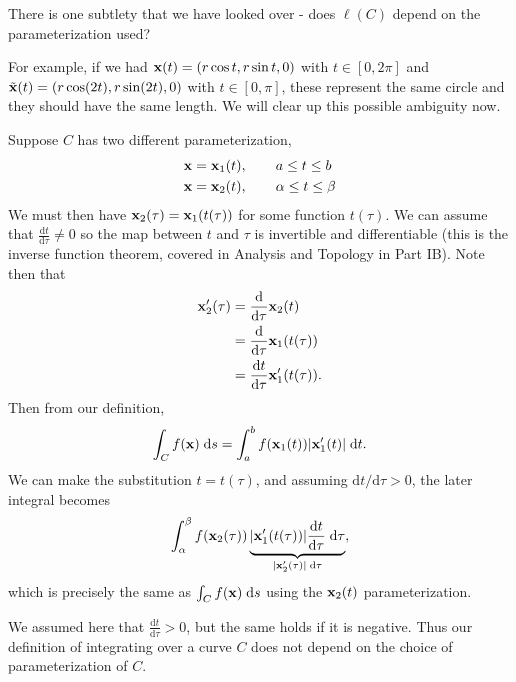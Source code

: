 \documentclass[a4paper]{scrreprt}
\begin{document}
There is one subtlety that we have looked over - does $\ell(C)$ depend on the parameterization used?

For example, if we had $\mathbf{x}(t) = (r \cos t, r \sin t, 0)$ with $t \in [0, 2 \pi]$ and $\tilde{\mathbf{x}}(t) = (r \cos(2 t), r \sin(2 t), 0)$ with $t \in [0, \pi]$, these represent the same circle and they should have the same length. We will clear up this possible ambiguity now.

Suppose $C$ has two different parameterization,
\begin{align*}
	\mathbf{x} &= \mathbf{x}_1(t), \quad \quad a \leq t \leq b \\
	\mathbf{x} &= \mathbf{x}_2(t), \quad \quad \alpha \leq t \leq \beta
\end{align*}
We must then have $\mathbf{x}_2(\tau) = \mathbf{x}_1(t(\tau))$ for some function $t(\tau)$. We can assume that $\frac{\mathrm{d} t}{\mathrm{d} \tau} \neq 0$ so the map between $t$ and $\tau$ is invertible and differentiable (this is the inverse function theorem, covered in Analysis and Topology in Part IB). Note then that 
\begin{align*}
	\mathbf{x}'_2(\tau) &= \frac{\mathrm{d}}{\mathrm{d}\tau} \mathbf{x}_2(t) \\
	&= \frac{\mathrm{d}} {\mathrm{d} \tau} \mathbf{x}_1(t(\tau)) \\
	&= \frac{\mathrm{d}t}{\mathrm{d} \tau} \mathbf{x}_1'(t(\tau)).
\end{align*}
Then from our definition,
$$
\int_C f(\mathbf{x}) \; \mathrm{d}s = \int_{a}^b f(\mathbf{x}_1(t)) |\mathbf{x}_1'(t)| \; \mathrm{d}t.
$$
We can make the substitution $t = t(\tau)$, and assuming $\mathrm{d}t/\mathrm{d}\tau > 0$, the later integral becomes
$$
\int_\alpha^\beta f(\mathbf{x}_2(\tau)) \underbrace{|\mathbf{x}_1'(t(\tau))| \frac{\mathrm{d}t}{\mathrm{d} \tau} \;\mathrm{d} \tau}_{|\mathbf{x}'_2 (\tau)| \; \mathrm{d}\tau},
$$
which is precisely the same as $\int_C f(\mathbf{x}) \; \mathrm{d}s$ using the $\mathbf{x}_2(t)$ parameterization. 

We assumed here that $\frac{\mathrm{d}t}{\mathrm{d} \tau} > 0$, but the same holds if it is negative. Thus our definition of integrating over a curve $C$ does not depend on the choice of parameterization of $C$.
\end{document}
